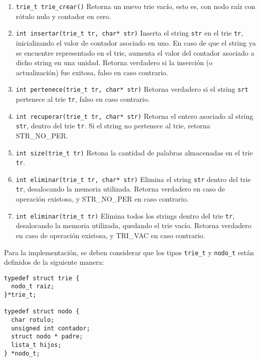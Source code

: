 \documentclass[12pt,a4paper]{article}
\begin{document}
\begin{enumerate}
	
	\item \texttt{trie\_t trie\_crear()} Retorna un nuevo trie vacío, esto es, con nodo raíz con rótulo nulo y contador en cero.
	
	\item \texttt{int insertar(trie\_t tr, char* str)} Inserta el string \texttt{str} en el trie \texttt{tr}, inicializando el valor de contador asociado en uno. En caso de que el string ya se encuentre representado en el trie, aumenta el valor del contador asociado a dicho string en una unidad. Retorna verdadero si la inserción (o actualización) fue exitosa, falso en caso contrario.

	\item \texttt{int pertenece(trie\_t tr, char* str)} Retorna verdadero si el string \texttt{srt} pertenece al trie \texttt{tr}, falso en caso contrario.
	
	\item \texttt{int recuperar(trie\_t tr, char* str)} Retorna el entero asociado al string \texttt{str}, dentro del trie \texttt{tr}. Si el string no pertenece al trie, retorna STR\_NO\_PER.

	\item \texttt{int size(trie\_t tr)} Retona la cantidad de palabras almacenadas en el trie \texttt{tr}.
	
	\item \texttt{int eliminar(trie\_t tr, char* str)} Elimina el string \texttt{str} dentro del trie \texttt{tr}, desalocando la memoria utilizada. Retorna verdadero en caso de operación existosa, y STR\_NO\_PER en caso contrario.
		
	\item \texttt{int eliminar(trie\_t tr)} Elimina todos los strings dentro del trie \texttt{tr}, desalocando la memoria utilizada, quedando el trie vacío. Retorna verdadero en caso de operación existosa, y TRI\_VAC en caso contrario.
	
\end{enumerate}

Para la implementación, se deben considerar que los tipos \texttt{trie\_t} y \texttt{nodo\_t} están definidos de la siguiente manera:

\begin{verbatim}
typedef struct trie {
  nodo_t raiz;
}*trie_t;

typedef struct nodo {
  char rotulo;
  unsigned int contador;
  struct nodo * padre;
  lista_t hijos;
} *nodo_t;
\end{verbatim}
\end{document}
